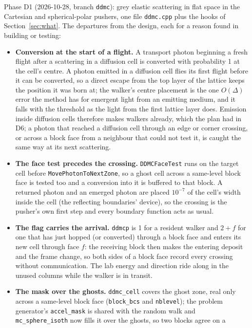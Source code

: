 \documentclass[11pt]{article}
\begin{document}
Phase D1 (2026-10-28, branch \texttt{ddmc}): grey elastic scattering in flat space in
the Cartesian and spherical-polar pushers, one file \texttt{ddmc.cpp} plus the hooks of
Section~\ref{sec:what}.  The departures from the design, each for a reason found in
building or testing:
\begin{itemize}
\item \textbf{Conversion at the start of a flight.}  A transport photon beginning a
  fresh flight after a scattering in a diffusion cell is converted with probability 1
  at the cell's centre.  A photon emitted in a diffusion cell flies its first flight
  before it can be converted, so a direct escape from the top layer of the lattice
  keeps the position it was born at; the walker's centre placement is the one
  $O(\Delta)$ error the method has for emergent light from an emitting medium, and it
  falls with the threshold as the light from the first lattice layer does.  Emission
  inside diffusion cells therefore makes walkers already, which the plan had in D6;
  a photon that reached a diffusion cell through an edge or corner crossing, or across
  a block face from a neighbour that could not test it, is caught the same way at its
  next scattering.
\item \textbf{The face test precedes the crossing.}  \texttt{DDMCFaceTest} runs on the
  target cell before \texttt{MovePhotonToNextZone}, so a ghost cell across a same-level
  block face is tested too and a conversion into it is buffered to that block.  A
  returned photon and an emerged photon are placed $10^{-7}$ of the cell's width inside
  the cell (the reflecting boundaries' device), so the crossing is the pusher's own
  first step and every boundary function acts as usual.
\item \textbf{The flag carries the arrival.}  \texttt{ddmcp} is 1 for a resident
  walker and $2 + f$ for one that has just hopped (or converted) through a block face
  and enters its new cell through face $f$: the receiving block then makes the
  entering deposit and the frame change, so both sides of a block face record every
  crossing without communication.  The lab energy and direction ride along in the
  unused columns while the walker is in transit.
\item \textbf{The mask over the ghosts.}  \texttt{ddmc\_cell} covers the ghost zone,
  real only across a same-level block face (\texttt{block\_bcs} and \texttt{nblevel});
  the problem generator's \texttt{accel\_mask} is shared with the random walk and
  \texttt{mc\_sphere\_isoth} now fills it over the ghosts, so two blocks agree on a

\end{itemize}
\end{document}
